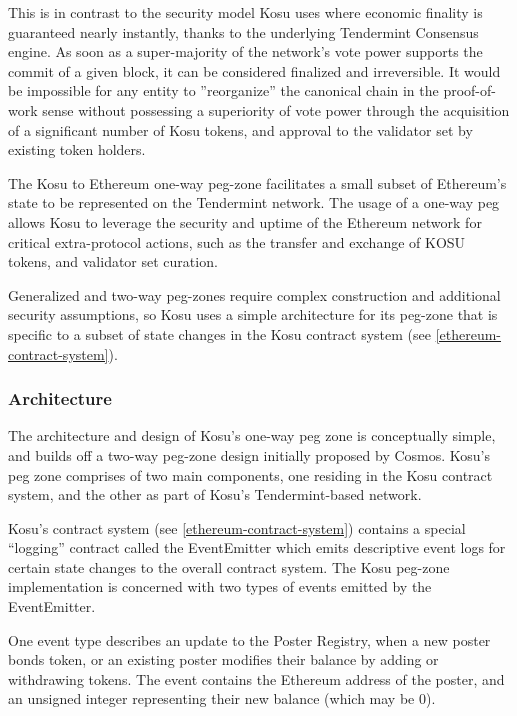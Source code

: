 \documentclass[10pt]{article}
\begin{document}
This is in contrast to the security model Kosu uses where economic finality is guaranteed nearly instantly, thanks to the underlying Tendermint Consensus\cite{tendermint, tendermint-wp} engine. As soon as a super-majority of the network’s vote power supports the commit of a given block, it can be considered finalized and irreversible. It would be impossible for any entity to ”reorganize” the canonical chain in the proof-of- work sense without possessing a superiority of vote power through the acquisition of a significant number of 
Kosu tokens, and approval to the validator set by existing token holders.
\medskip

The Kosu to Ethereum one-way peg-zone facilitates a small subset of Ethereum’s state to be represented on the Tendermint network. The usage of a one-way peg allows Kosu to leverage the security and uptime of the Ethereum network for critical extra-protocol actions, such as the transfer and exchange of KOSU tokens, and validator set curation.
\medskip

Generalized and two-way peg-zones require complex construction\cite{peggy-spec} and additional security assumptions, so Kosu uses a simple architecture for its peg-zone that is specific to a subset of state changes in the Kosu contract system (see \ref{ethereum-contract-system}).
\subsubsection{Architecture}\label{peg-architecture}
The architecture and design of Kosu’s one-way peg zone is conceptually simple, and builds off a two-way peg-zone design initially proposed by Cosmos\cite{peggy-spec}. Kosu’s peg zone comprises of two main components, one residing in the Kosu contract system, and the other as part of Kosu’s Tendermint-based network.
\medskip

Kosu’s contract system (see \ref{ethereum-contract-system}) contains a special “logging” contract called the EventEmitter which emits descriptive event logs for certain state changes to the overall contract system. The Kosu peg-zone implementation is concerned with two types of events emitted by the EventEmitter.
\medskip

One event type describes an update to the Poster Registry, when a new poster bonds token, or an existing poster modifies their balance by adding or withdrawing tokens. The event contains the Ethereum address of the poster, and an unsigned integer representing their new balance (which may be 0).
\medskip 
\end{document}
